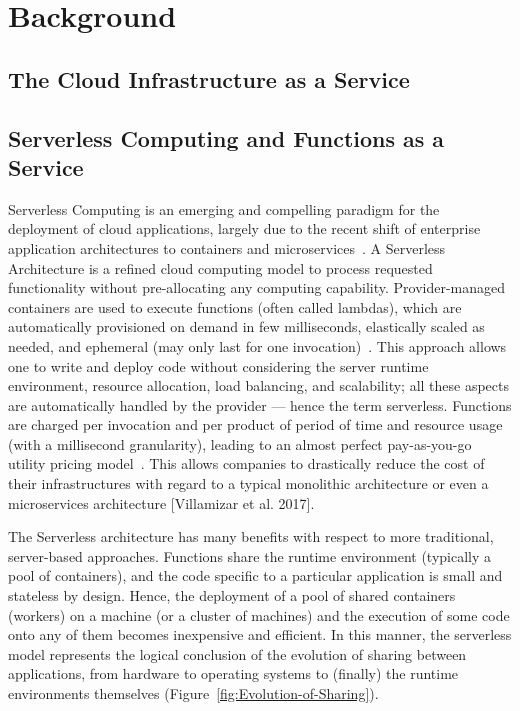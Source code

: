\section{Background}\label{sec:background}

\subsection{The Cloud Infrastructure as a Service}


\subsection{Serverless Computing and Functions as a Service}

Serverless Computing is an emerging and compelling paradigm for the deployment of cloud applications, largely due to the recent shift of enterprise application architectures to containers and microservices~\cite{baldini2017serverless}.  A Serverless Architecture is a refined cloud computing model to process requested functionality without pre-allocating any computing capability. Provider-managed containers are used to execute functions (often called lambdas), which are automatically provisioned on demand in few milliseconds, elastically scaled as needed, and ephemeral (may only last for one invocation)~\cite{Roberts2016serverless}. This approach allows one to write and deploy code without considering the server runtime
environment, resource allocation, load balancing, and scalability; all these aspects are automatically handled by the provider --- hence the term serverless. Functions are charged per invocation and per product of period of time and resource usage (with a millisecond granularity), leading to an almost perfect pay-as-you-go utility pricing model~\cite{3 MateosFaas}.  This allows companies to drastically reduce the cost of their infrastructures with regard to a typical monolithic architecture or even a microservices architecture [Villamizar et al. 2017].

The Serverless architecture has many benefits with respect to more traditional, server-based approaches. Functions share the runtime environment (typically a pool of containers), and the code specific to a particular application is small and stateless by design. Hence, the deployment of a pool of shared containers (workers) on a machine (or a cluster of machines) and the execution of some code onto any of them becomes inexpensive and efficient. In this manner, the serverless model represents the logical conclusion of the evolution of sharing between applications, from hardware to operating systems to (finally) the runtime environments themselves (Figure~\ref{fig:Evolution-of-Sharing}).

